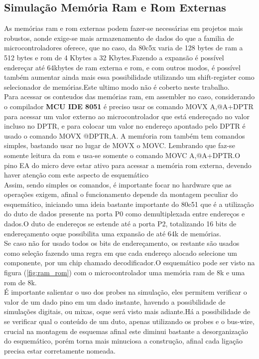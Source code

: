 \documentclass{Fabiano_file}
\begin{document}
\subsection{Simulação Memória Ram e Rom Externas}
As memórias ram e rom externas podem fazer-se necessárias em projetos mais robustos, aonde exige-se mais armazenamento de dados do que a familia de 
microcontroladores oferece, que no caso, da 80c5x varia de 128 bytes de ram a 512 bytes e rom de 4 Kbytes a 32 Kbytes.Fazendo a expansão é possível endereçar 
até 64kbytes de ram externa e rom, e com outros modos, é possível também aumentar ainda mais essa possibilidade utilizando um shift-register como selecionador 
de memórias.Este ultimo modo não é coberto neste trabalho.\\
Para acessar os conteudos das memórias ram, em assembler no caso, considerando o compilador \textbf{MCU IDE 8051} é preciso usar os comando MOVX A,@A+DPTR
para acessar um valor externo ao microcontrolador que está endereçado no valor incluso no DPTR, e para colocar um valor no endereço apontado pelo DPTR é usado o
comando MOVX @DPTR,A. A memŕoria rom também tem comandos simples, bastando usar no lugar de MOVX o MOVC. Lembrando que faz-se somente leitura da rom e 
usa-se somente o comando MOVC A,@A+DPTR.O pino EA do micro deve estar ativo para acessar a memória rom externa, devendo haver atenção com este aspecto de esquemático\\
Assim, sendo simples os comandos, é importante focar no hardware que as operações exigem, afinal o funcionamento depende da montagem peculiar do esquemático,
iniciando uma ideia bastante importante do 80c51 que é a utilização do duto de dados presente na porta P0 como demultiplexada entre endereços e dados.O duto de 
endereços se estende até a porta P2, totalizando 16 bits de endereçamento oque possibilita uma expansão de até 64k de memórias.\\
Se caso não for usado todos os bits de endereçamento, os restante são usados como seleção fazendo uma regra em que cada endereço alocado selecione um componente,
por um chip chamado decodificador.O esquemático pode ser visto na figura (\ref{fig:ram_rom}) com o microcontrolador uma memória ram de 8k e uma rom de 8k.\\
É importante salientar o uso dos probes na simulação, eles permitem verificar o valor de um dado pino em um dado instante, havendo a possibilidade de simulações
digitais, ou mixas, oque será visto mais adiante.Há a possibilidade de se verificar qual o conteúdo de um duto, apenas utilizando os probes e o bus-wire, crucial
na montagem de esquemas afinal este diminui bastante a desorganização do esquemático, porém torna mais minuciosa a construção, afinal cada ligação precisa estar
corretamente nomeada.
\end{document}
